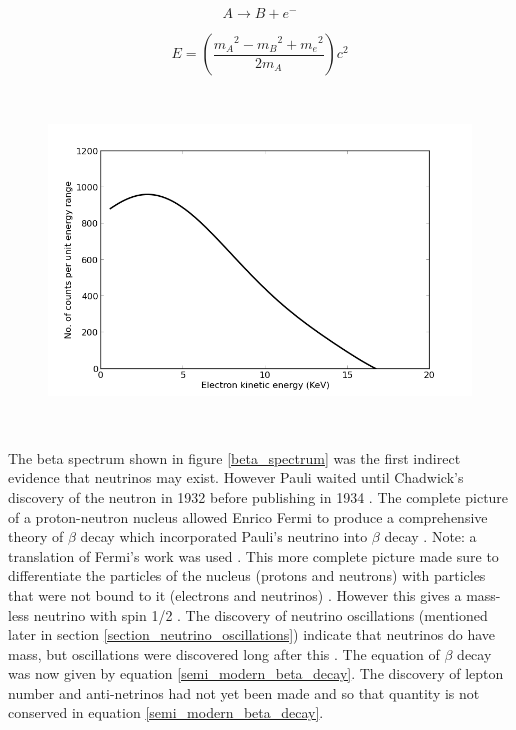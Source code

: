 \begin{equation}
    A \rightarrow B + e^-
    \label{oldBetaDecay}
\end{equation}

\begin{equation}
    E = \left( \frac{{m_A}^2 - {m_B}^2 + {m_e}^2}{2m_A}\right) c^2
    \label{constant_ke_e_equation}
\end{equation}

\begin{figure}[htbp]
 \centering
 \includegraphics[height=90mm]{Chapter1/Figs/Raster/beta_spectrum.png}
 \label{fig:beta_spectrum}
\end{figure}

The beta spectrum shown in figure \ref{beta_spectrum} was the first indirect evidence that neutrinos may exist. However Pauli waited until Chadwick's discovery of the neutron in 1932 \cite{chadwick1932possible} before publishing in 1934 \cite{lederman1970resource}. The complete picture of a proton-neutron nucleus allowed Enrico Fermi to produce a comprehensive theory of $\beta$ decay which incorporated Pauli's neutrino into $\beta$ decay \cite{lederman1970resource} \cite{Fermi:1934hr}. Note: a translation of Fermi's work was used \cite{wilson1968fermi}. This more complete picture made sure to differentiate the particles of the nucleus (protons and neutrons) with particles that were not bound to it (electrons and neutrinos) \cite{Fermi:1934hr} \cite{wilson1968fermi}. However this gives a mass-less neutrino with spin 1/2 \cite{lederman1970resource}. The discovery of neutrino oscillations (mentioned later in section \ref{section_neutrino_oscillations}) indicate that neutrinos do have mass, but oscillations were discovered long after this \cite{griffiths2008book} \cite{griffiths2008neutrino1.5}. The equation of $\beta$ decay was now given by equation \ref{semi_modern_beta_decay}. The discovery of lepton number and anti-netrinos had not yet been made and so that quantity is not conserved in equation \ref{semi_modern_beta_decay}. 

